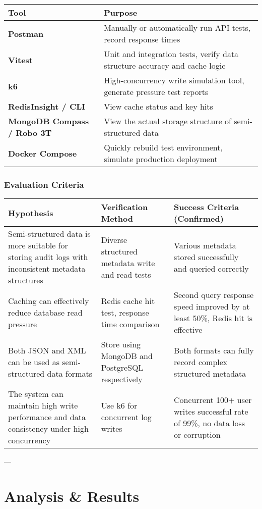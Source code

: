 \documentclass{article}
\begin{document}
\begin{tabular}{|l|l|}
\hline
\textbf{Tool} & \textbf{Purpose} \\
\hline
\textbf{Postman} & Manually or automatically run API tests, record response times \\
\textbf{Vitest} & Unit and integration tests, verify data structure accuracy and cache logic \\
\textbf{k6} & High-concurrency write simulation tool, generate pressure test reports \\
\textbf{RedisInsight / CLI} & View cache status and key hits \\
\textbf{MongoDB Compass / Robo 3T} & View the actual storage structure of semi-structured data \\
\textbf{Docker Compose} & Quickly rebuild test environment, simulate production deployment \\
\hline
\end{tabular}

\subsubsection{Evaluation Criteria}

\begin{tabular}{|l|l|l|}
\hline
\textbf{Hypothesis} & \textbf{Verification Method} & \textbf{Success Criteria (Confirmed)} \\
\hline
Semi-structured data is more suitable for storing audit logs with inconsistent metadata structures & Diverse structured metadata write and read tests & Various metadata stored successfully and queried correctly \\
Caching can effectively reduce database read pressure & Redis cache hit test, response time comparison & Second query response speed improved by at least 50\%, Redis hit is effective \\
Both JSON and XML can be used as semi-structured data formats & Store using MongoDB and PostgreSQL respectively & Both formats can fully record complex structured metadata \\
The system can maintain high write performance and data consistency under high concurrency & Use k6 for concurrent log writes & Concurrent 100+ user writes successful rate of 99\%, no data loss or corruption \\
\hline
\end{tabular}

---

\section{Analysis \& Results}
\end{document}
